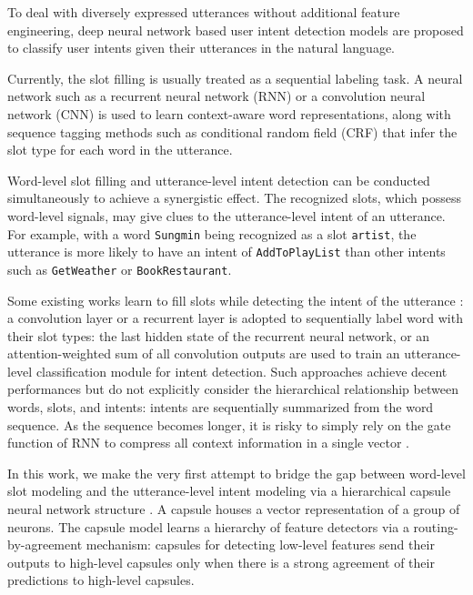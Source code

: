To deal with diversely expressed utterances without additional feature engineering, deep neural network based user intent detection models \citep{hu2009understanding,xu2013convolutional,zhang2016mining,liu2016attention,zhang2017bringing,chen2016end,xia2018zero} are proposed to classify user intents given their utterances in the natural language. 

Currently, the slot filling is usually treated as a sequential labeling task. A neural network such as a recurrent neural network (RNN) or a convolution neural network (CNN) is used to learn context-aware word representations, along with sequence tagging methods such as conditional random field (CRF) \citep{lafferty2001conditional} that infer the slot type for each word in the utterance.

Word-level slot filling and utterance-level intent detection can be conducted simultaneously to achieve a synergistic effect.
The recognized slots, which possess word-level signals, may give clues to the utterance-level intent of an utterance. For example, with a word \texttt{Sungmin} being recognized as a slot \texttt{artist}, the utterance is more likely to have an intent of \texttt{AddToPlayList} than other intents such as \texttt{GetWeather} or \texttt{BookRestaurant}. 

Some existing works learn to fill slots while detecting the intent of the utterance \cite{xu2013convolutional,hakkani2016multi,liu2016attention,goo2018slot}: a convolution layer or a recurrent layer is adopted to sequentially label word with their slot types: the last hidden state of the recurrent neural network, or an attention-weighted sum of all convolution outputs are used to train an utterance-level classification module for intent detection. Such approaches achieve decent performances but do not explicitly consider the hierarchical relationship between words, slots, and intents: intents are sequentially summarized from the word sequence.
As the sequence becomes longer, it is risky to simply rely on the gate function of RNN to compress all context information in a single vector \cite{cheng2016long}.

In this work, we make the very first attempt to bridge the gap between word-level slot modeling and the utterance-level intent modeling via a hierarchical capsule neural network structure \citep{hinton2011transforming,sabour2017dynamic}.
A capsule houses a vector representation of a group of neurons.
The capsule model learns a hierarchy of feature detectors via a routing-by-agreement mechanism: capsules for detecting low-level features send their outputs to high-level capsules only when there is a strong agreement of their predictions to high-level capsules.

